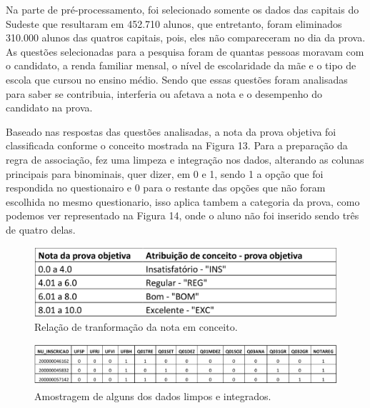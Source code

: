 \par
Na parte de pré-processamento, foi selecionado somente os dados das capitais do Sudeste que resultaram em 452.710 alunos, que entretanto, foram eliminados 310.000 alunos das quatros capitais, pois, eles não compareceram no dia da prova. As questões selecionadas para a pesquisa  foram de quantas pessoas moravam com o candidato, a renda familiar mensal, o nível de escolaridade da mãe e o tipo de escola que cursou no ensino médio. Sendo que essas questões foram analisadas para saber se contribuia, interferia ou afetava a nota e o desempenho do candidato na prova.

\par
Baseado nas respostas das questões analisadas, a nota da prova objetiva foi classificada conforme o conceito mostrada na Figura 13. Para a preparação da regra de associação,  fez uma limpeza e integração nos dados, alterando as colunas principais para binominais, quer dizer, em 0 e 1, sendo 1 a opção que foi respondida no questionairo e 0 para o restante das opções que não foram escolhida no mesmo questionario, isso aplica tambem a categoria da prova, como podemos ver representado na Figura 14, onde o aluno não foi inserido sendo três de quatro delas. 


\begin{figure}[!htp]
	\begin{center}
    \caption{\label{fig:waveform_fig} Relação de tranformação da nota em conceito.}
	\includegraphics[scale=0.50]{Figuras/Prova_objetiva.png}
	\end{center}
\end{figure}

\begin{figure}[!htp]
	\begin{center}
    \caption{\label{fig:waveform_fig} Amostragem de alguns dos dados limpos e integrados.}
	\includegraphics[scale=0.49]{Figuras/Dados_limpos_integrados.png}
	\end{center}
\end{figure}

